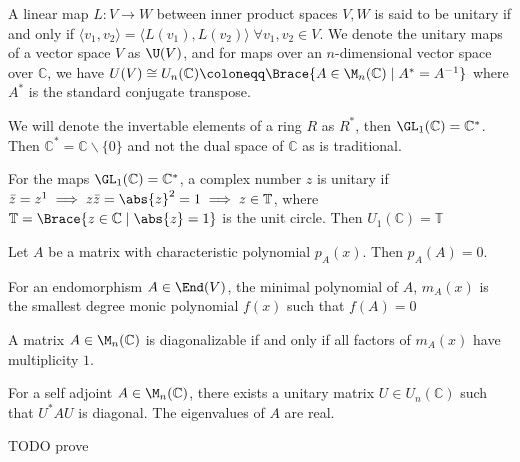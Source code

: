 \documentclass[../Project.tex]{subfiles}
\begin{document}
\begin{defi}
	A linear map $L : V \to W$ between inner product spaces $V,W$ is said to be unitary if and only if $\langle v_1, v_2\rangle  = \langle L(v_1), L(v_2) \rangle\;\forall v_1,v_2 \in V$.
	We denote the unitary maps of a vector space $V$ as $\U(V)$, and for maps over an $n$-dimensional vector space over $\mathbb{C}$, we have $U(V) \cong U_n(\mathbb{C}) \coloneqq \Brace{A \in \M_n(\mathbb{C}) \;\vert\; A^* = A^{-1}}$ where $A^*$ is the standard conjugate transpose.
\end{defi}

We will denote the invertable elements of a ring $R$ as $R^*$, then $\GL_1(\mathbb{C}) = \mathbb{C}^*$. Then $\mathbb{C}^* = \mathbb{C}\backslash \{0\}$ and not the dual space of $\mathbb{C}$ as is traditional.

\begin{exam}[\cite{1}]
	For the maps $\GL_1(\mathbb{C}) = \mathbb{C}^*$, a complex number $z$ is unitary if $\bar{z} = z^1 \implies z\bar{z} = \abs{z}^2 = 1 \implies z \in \mathbb{T}$, where $\mathbb{T} = \Brace{z \in \mathbb{C}\;\vert\;\abs{z} = 1}$ is the unit circle. Then $U_1(\mathbb{C}) = \mathbb{T}$
\end{exam}

\begin{theo}
	Let $A$ be a matrix with characteristic polynomial $p_A(x)$. Then $p_A(A) = 0$.
\end{theo}

\begin{defi}
	For an endomorphism $A \in \End(V)$, the minimal polynomial of $A$, $m_A(x)$ is the smallest degree monic polynomial $f(x)$ such that $f(A) = 0$
\end{defi}

\begin{theo}[\cite{1}]
	A matrix $A \in \M_n(\mathbb{C})$ is diagonalizable if and only if all factors of $m_A(x)$ have multiplicity $1$.
\end{theo}

\begin{theo}
	For a self adjoint $A \in \M_n(\mathbb{C})$, there exists a unitary matrix $U \in U_n(\mathbb{C})$ such that $U^* AU$ is diagonal. The eigenvalues of $A$ are real.
\end{theo}

TODO prove
\end{document}

